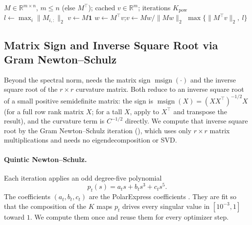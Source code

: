 \documentclass[11pt]{article}
\DeclareMathOperator{\msign}{msign}          %
\newcommand{\norm}[1]{\| #1\|}
\theoremstyle{plain}
\theoremstyle{definition}
\theoremstyle{remark}
\theoremstyle{definition}
\begin{document}
\begin{algorithm}[ht]
\caption{Guarded spectral-norm estimate of $\norm{M}_2$}
\label{alg:smax}
\begin{algorithmic}[1]
\Require $M\in\mathbb{R}^{m\times n}$, $m\le n$ (else $M^\top$); cached $v\in\mathbb{R}^m$; iterations $K_{\mathrm{pow}}$
\State $l \gets \max_i\norm{M_{i,:}}_2$
 
  \State $v\gets M\mathbf{1}$
\EndIf
{} 
  \State $w\gets M^\top v$;\quad $v\gets Mw/\norm{Mw}_2$
\EndFor
\State \Return $\max\big\{\norm{M^\top v}_2,\ l\big\}$
\end{algorithmic}
\end{algorithm}

\subsection{Matrix Sign and Inverse Square Root via Gram Newton--Schulz}
\label{app:gramns}

Beyond the spectral norm,  needs the matrix sign $\msign(\cdot)$
and the inverse square root of the $r \times r$ curvature matrix.  Both reduce to
an inverse square root of a small positive semidefinite matrix: the sign is
$\msign(X)=(XX^\top)^{-1/2}X$ (for a full row rank matrix $X$; for a tall $X$, apply to $X^\top$ and transpose the result), and the curvature term is $C^{-1/2}$ directly.  We
compute that inverse square root by the Gram Newton--Schulz iteration
\cite{gram_ns} (), which uses only $r\times r$ matrix
multiplications and needs no eigendecomposition or SVD.

\paragraph{Quintic Newton--Schulz.}
Each iteration applies an odd degree-five polynomial
\begin{equation}\label{e-gram-ns-poly}
    p_t(s)
    =
    a_t s + b_t s^3 + c_t s^5 .
\end{equation}
The coefficients $(a_t,b_t,c_t)$ are the PolarExpress coefficients
\cite{polarexpress}. They are fit so that the composition of the $K$ maps
$p_t$ drives every singular value in $[10^{-3},1]$ toward $1$. We compute
them once and reuse them for every optimizer step.
\end{document}
